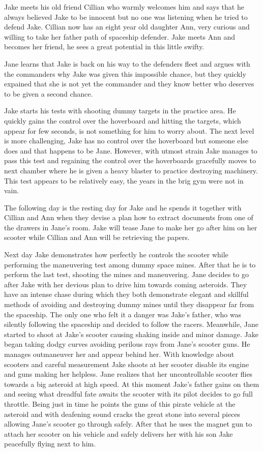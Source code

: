 \documentclass{article}
\begin{document}
Jake meets his old friend Cillian who warmly welcomes him and says that he
always believed Jake to be innocent but no one was listening when he tried to
defend Jake. Cillian now has an eight year old daughter Ann, very curious and
willing to take her father path of spaceship defender. Jake meets Ann and
becomes her friend, he sees a great potential in this little swifty.

Jane learns that Jake is back on his way to the defenders fleet and argues with
the commanders why Jake was given this impossible chance, but they quickly
expained that she is not yet the commander and they know better who deserves to
be given a second chance.

Jake starts his tests with shooting dummy targets in the practice area. He
quickly gains the control over the hoverboard and hitting the targets, which
appear for few seconds, is not something for him to worry about. The next level
is more challenging, Jake has no control over the hoverboard but someone else
does and that happens to be Jane. However, with utmost strain Jake manages to
pass this test and regaining the control over the hoverboards gracefully moves
to next chamber where he is given a heavy blaster to practice destroying
machinery. This test appears to be relatively easy, the years in the brig gym
were not in vain.

The following day is the resting day for Jake and he spends it together with
Cillian and Ann when they devise a plan how to extract documents from one of the
drawers in Jane's room. Jake will tease Jane to make her go after him on her
scooter while Cillian and Ann will be retrieving the papers.

Next day Jake demonstrates how perfectly he controls the scooter while
performing the maneuvering test among dummy space mines. After that he is to
perform the last test, shooting the mines and maneuvering. Jane decides to go
after Jake with her devious plan to drive him towards coming asteroids. They
have an intense chase during which they both demonstrate elegant and skillful
methods of avoiding and destroying dummy mines until they disappear far from the
spaceship. The only one who felt it a danger was Jake's father, who was silently
following the spaceship and decided to follow the racers. Meanwhile, Jane
started to shoot at Jake's scooter causing shaking inside and minor damage. Jake
began taking dodgy curves avoiding perilous rays from Jane's scooter guns. He
manages outmaneuver her and appear behind her. With knowledge about scooters and
careful measurement Jake shoots at her scooter disable its engine and guns
making her helpless. Jane realizes that her uncontrollable scooter flies towards
a big asteroid at high speed. At this moment Jake's father gains on them and
seeing what dreadful fate awaits the scooter with its pilot decides to go full
throttle. Being just in time he points the guns of this pirate vehicle at the
asteroid and with deafening sound cracks the great stone into several pieces
allowing Jane's scooter go through safely. After that he uses the magnet gun to
attach her scooter on his vehicle and safely delivers her with his son Jake
peacefully flying next to him.
\end{document}
